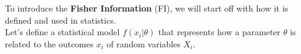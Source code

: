 To introduce the \textbf{Fisher Information} (FI), we will start off with how it is defined and used in statistics.\\
Let's define a statistical model $f(x_i|\theta)$ that represents how a parameter $\theta$ is related to the outcomes $x_i$ of random variables $X_i$\cite{StatisticFisherInfoTutorial}.  